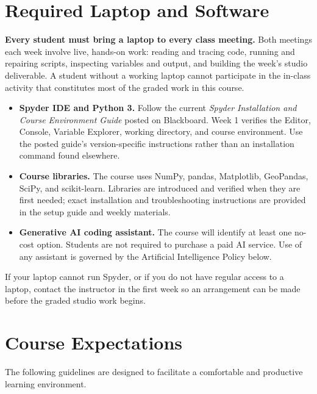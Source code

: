 \documentclass[11pt]{article}
\begin{document}
\section{Required Laptop and Software}

\textbf{Every student must bring a laptop to every class meeting.} Both meetings each week
involve live, hands-on work: reading and tracing code, running and repairing scripts,
inspecting variables and output, and building the week's studio deliverable. A student without
a working laptop cannot participate in the in-class activity that constitutes most of the
graded work in this course.

\begin{itemize}
  \item \textbf{Spyder IDE and Python 3.} Follow the current \emph{Spyder Installation and
        Course Environment Guide} posted on Blackboard.
        Week 1 verifies the Editor, Console, Variable Explorer, working directory, and course
        environment. Use the posted guide's version-specific instructions rather than an
        installation command found elsewhere.
  \item \textbf{Course libraries.} The course uses NumPy, pandas, Matplotlib, GeoPandas,
        SciPy, and scikit-learn. Libraries are introduced and verified when they are first
        needed; exact installation and troubleshooting instructions are provided in the setup
        guide and weekly materials.
  \item \textbf{Generative AI coding assistant.} The course will identify at least one
        no-cost option. Students are not required to purchase a paid AI service. Use of any
        assistant is governed by the Artificial Intelligence Policy below.
\end{itemize}

If your laptop cannot run Spyder, or if you do not have regular access to a laptop, contact
the instructor in the first week so an arrangement can be made before the graded studio work
begins.

\newpage
\section{Course Expectations}

The following guidelines are designed to facilitate a comfortable and productive learning
environment.
\end{document}
